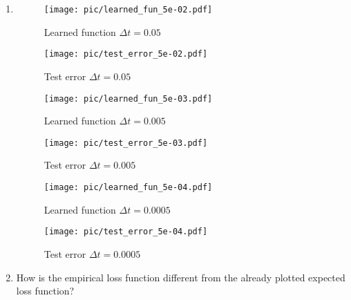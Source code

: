 \documentclass[a4paper,11pt]{scrartcl}
\newcommand*{\Dt}{\Delta{}t}
\begin{document}
\begin{enumerate}
\begin{enumerate}[leftmargin=1em]
  \item
    \begin{figure}[h]
        \begin{minipage}[b]{.5\linewidth}
          \centering
          \texttt{[image: pic/learned\_fun\_5e-02.pdf]}
          \caption{Learned function $\Dt=0.05$}
          \label{fig:learned_fun_0.05}
        \end{minipage}%
        \begin{minipage}[b]{.5\linewidth}
          \centering
          \texttt{[image: pic/test\_error\_5e-02.pdf]}
          \caption{Test error $\Dt=0.05$}
          \label{fig:test_error_0.05}
        \end{minipage}
    \end{figure}
    \begin{figure}[h]
        \begin{minipage}[b]{.5\linewidth}
          \centering
          \texttt{[image: pic/learned\_fun\_5e-03.pdf]}
          \caption{Learned function $\Dt=0.005$}
          \label{fig:learned_fun_0.005}
        \end{minipage}%
        \begin{minipage}[b]{.5\linewidth}
          \centering
          \texttt{[image: pic/test\_error\_5e-03.pdf]}
          \caption{Test error $\Dt=0.005$}
          \label{fig:test_error_0.005}
        \end{minipage}
    \end{figure}
    \begin{figure}[h]
        \begin{minipage}[b]{.5\linewidth}
          \centering
          \texttt{[image: pic/learned\_fun\_5e-04.pdf]}
          \caption{Learned function $\Dt=0.0005$}
          \label{fig:learned_fun_0.0005}
        \end{minipage}%
        \begin{minipage}[b]{.5\linewidth}
          \centering
          \texttt{[image: pic/test\_error\_5e-04.pdf]}
          \caption{Test error $\Dt=0.0005$}
          \label{fig:test_error_0.0005}
        \end{minipage}
    \end{figure}

  \item
    How is the empirical loss function different from the already plotted
    expected loss function?


\end{enumerate}
\end{enumerate}
\end{document}
